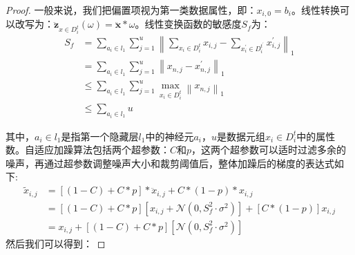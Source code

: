 \begin{proof}
一般来说，我们把偏置项视为第一类数据属性，即：$x_{i,0}=b_{i}$。线性转换可以改写为：$\ddot{\mathbf{z}}_{x \in D_{i}^{t}}(\omega)=\ddot{\mathbf{x}} * \omega$。线性变换函数的敏感度$S_{f}$为：
\begin{equation}
\begin{aligned}
S_{f} &=\sum_{a_{i} \in l_{1}} \sum_{j=1}^{u}\left\|\sum_{x_{i} \in D_{i}^{t}} x_{i, j}-\sum_{x_{i}^{\prime} \in D_{i}^{t^{\prime}}} x_{i, j}^{\prime}\right\|_{1} \\
&=\sum_{a_{i} \in l_{1}} \sum_{j=1}^{u}\left\|x_{n, j}-x_{n, j}^{\prime}\right\|_{1} \\
& \leq \sum_{a_{i} \in l_{1}} \sum_{j=1}^{u} \max _{x_{i} \in D_{i}^{t}}\left\|x_{n, j}\right\|_{1} \\
& \leq \sum_{a_{i} \in l_{1}} u
\end{aligned}
\end{equation}

其中，$a_{i} \in l_{1}$是指第一个隐藏层$l_{1}$中的神经元$a_{i}$，$u$是数据元组$x_{i} \in D_{i}^{t}$中的属性数。自适应加躁算法包括两个超参数：$C$和$p$，这两个超参数可以适时过滤多余的噪声，再通过超参数调整噪声大小和裁剪阈值后，整体加躁后的梯度的表达式如下:
\begin{equation}
\begin{aligned}
\tilde{x}_{i, j} &=[(1-C)+C * p] * \ddot{x}_{i, j}+C *(1-p) * x_{i, j} \\
&=[(1-C)+C * p]\left[x_{i, j}+\mathcal{N}\left(0, S_{f}^{2} \cdot \sigma^{2}\right)\right]+[C *(1-p)] x_{i, j} \\
&=x_{i, j}+[(1-C)+C * p]\left[\mathcal{N}\left(0, S_{f}^{2} \cdot \sigma^{2}\right)\right]
\end{aligned}
\end{equation}
然后我们可以得到：


\end{proof}
